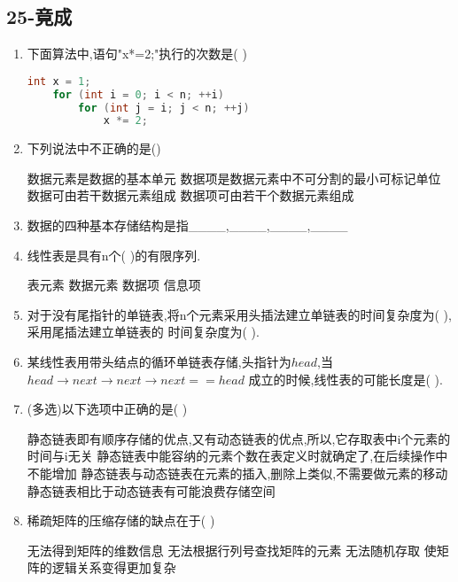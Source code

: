 \documentclass[12pt, a4paper, oneside, UTF8]{ctexbook}
\begin{document}
\newpage
\subsection{25-竟成}

\begin{enumerate}
    \item 下面算法中,语句"x*=2;"执行的次数是(   ) 
    \begin{lstlisting}[language=C]
    int x = 1;
    for (int i = 0; i < n; ++i)
        for (int j = i; j < n; ++j)
            x *= 2;
    \end{lstlisting}

    \item 下列说法中不正确的是() 
    \begin{choices}[1]
        \task 数据元素是数据的基本单元
        \task 数据项是数据元素中不可分割的最小可标记单位
        \task 数据可由若干数据元素组成 
        \task 数据项可由若干个数据元素组成 
    \end{choices}

    \item 数据的四种基本存储结构是指\_\_\_\_,\_\_\_\_,\_\_\_\_,\_\_\_\_ 

    \item 线性表是具有n个(    )的有限序列. 
    \begin{choices}
        \task 表元素 
        \task 数据元素 
        \task 数据项 
        \task 信息项 
    \end{choices}

    \item 对于没有尾指针的单链表,将n个元素采用头插法建立单链表的时间复杂度为(    ),采用尾插法建立单链表的
    时间复杂度为(    ). 

    \item 某线性表用带头结点的循环单链表存储,头指针为$head$,当$head\rightarrow next\rightarrow next \rightarrow next == head$
    成立的时候,线性表的可能长度是(    ). 

    \item (多选)以下选项中正确的是(   ) 
    \begin{choices}[1]
        \task 静态链表即有顺序存储的优点,又有动态链表的优点,所以,它存取表中i个元素的时间与i无关 
        \task 静态链表中能容纳的元素个数在表定义时就确定了,在后续操作中不能增加 
        \task 静态链表与动态链表在元素的插入,删除上类似,不需要做元素的移动 
        \task 静态链表相比于动态链表有可能浪费存储空间 
    \end{choices}

    \item 稀疏矩阵的压缩存储的缺点在于(  ) 
    \begin{choices}[2]
        \task 无法得到矩阵的维数信息 
        \task 无法根据行列号查找矩阵的元素 
        \task 无法随机存取 
        \task 使矩阵的逻辑关系变得更加复杂 
    \end{choices}


\end{enumerate}
\end{document}
